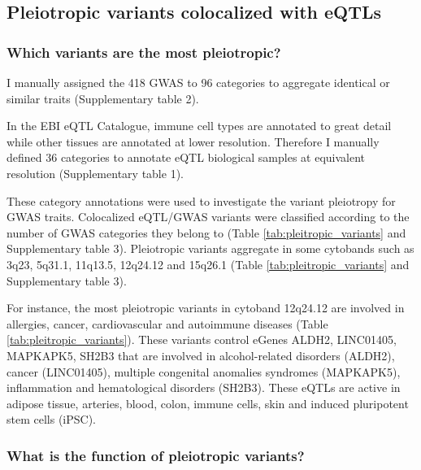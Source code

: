 \subsection*{Pleiotropic variants colocalized with eQTLs}

\subsubsection*{Which variants are the most pleiotropic?}

I manually assigned the 418 GWAS to 96 categories to aggregate identical or similar traits (Supplementary table 2).

%
In the EBI eQTL Catalogue, immune cell types are annotated to great detail while other tissues are annotated at lower resolution.
%
Therefore I manually defined 36 categories to annotate eQTL biological samples at equivalent resolution (Supplementary table 1).

These category annotations were used to investigate the variant pleiotropy for GWAS traits.
%
Colocalized eQTL/GWAS variants were classified according to the number of GWAS categories they belong to (Table \ref{tab:pleitropic_variants} and Supplementary table 3).
%
Pleiotropic variants aggregate in some cytobands such as 3q23, 5q31.1, 11q13.5, 12q24.12 and 15q26.1 (Table \ref{tab:pleitropic_variants} and Supplementary table 3).

For instance, the most pleiotropic variants in cytoband 12q24.12 are involved in allergies, cancer, cardiovascular and autoimmune diseases (Table \ref{tab:pleitropic_variants}).
%
These variants control eGenes ALDH2, LINC01405, MAPKAPK5, SH2B3 that are involved in alcohol-related disorders (ALDH2), cancer (LINC01405), multiple congenital anomalies syndromes (MAPKAPK5),  inflammation and hematological disorders (SH2B3).
%
These eQTLs are active in adipose tissue, arteries, blood, colon, immune cells, skin and induced pluripotent stem cells (iPSC).

\subsubsection*{What is the function of pleiotropic variants?}

